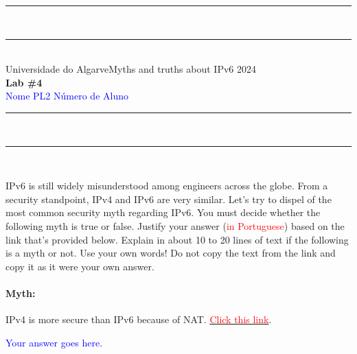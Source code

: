 \documentclass{article}
\begin{document}
\begin{center}
\rule{\textwidth}{.0075in} \\
\rule[3mm]{\textwidth}{.0075in}\\

Universidade do Algarve\hfill Myths and truths about IPv6 \hfill 2024\\[3ex]

{\Large\bf Lab \#4} \\[3ex]

 \textcolor{blue}{Nome} \hfill  
 \textcolor{blue}{PL2} \hfill
 \textcolor{blue}{Número de Aluno}\\

\rule{\textwidth}{.0075in} \\
\rule[3mm]{\textwidth}{.0075in} \\
\end{center}

\bigskip

\noindent
IPv6 is still widely misunderstood among engineers across the
globe. From a security standpoint, IPv4 and IPv6 are very
similar. Let's try to dispel of the most common security myth
regarding IPv6. You must decide whether the following myth is true or
false. Justify your answer (\textcolor{red}{in Portuguese}) based on
the link that's provided below. Explain in about 10 to 20 lines of
text if the following is a myth or not. Use your own words! Do not
copy the text from the link and copy it as it were your own answer.

\noindent
\paragraph{Myth:} IPv4 is more secure than IPv6 because of NAT. 
\href{https://security.stackexchange.com/questions/44065/with-ipv6-do-we-need-to-use-nat-any-more}{\textcolor{red}{Click
    this link}}.\\

\bigskip

\textcolor{blue}{%
  Your answer goes here.
} \\

\bigskip
\end{document}
